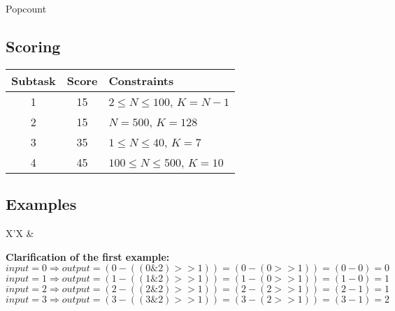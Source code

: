 \begin{statement}[
  problempoints=110,
  timelimit=1 sekunda,
  memorylimit=512 MiB,
]{Popcount}
\subsection*{Scoring}
{\renewcommand{\arraystretch}{1.4}
  \setlength{\tabcolsep}{6pt}
  \begin{tabular}{ccl}
 Subtask & Score & Constraints \\ \midrule
  1 & 15 & $2 \le N \le 100$, $K = N - 1$ \\
  2 & 15 & $N = 500$, $K = 128$ \\
  3 & 35 & $1 \le N \le 40$, $K=7$ \\
  4 & 45 & $100 \le N \le 500$, $K=10$
\end{tabular}}

\subsection*{Examples}
\begin{tabularx}{\textwidth}{X'X}
 &
\end{tabularx}

\textbf{Clarification of the first example:} \\
$input=0 \Rightarrow output=(0-((0\&2)>>1))=(0-(0>>1))=(0-0)=0$\\
$input=1 \Rightarrow output=(1-((1\&2)>>1))=(1-(0>>1))=(1-0)=1$\\
$input=2 \Rightarrow output=(2-((2\&2)>>1))=(2-(2>>1))=(2-1)=1$\\
$input=3 \Rightarrow output=(3-((3\&2)>>1))=(3-(2>>1))=(3-1)=2$

\end{statement}

